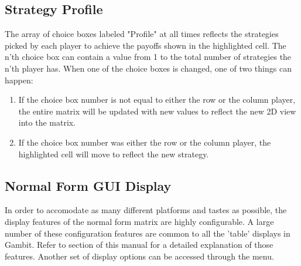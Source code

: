 \subsection{Strategy Profile}
The array of choice boxes labeled "Profile" at all times reflects the
strategies picked by each player to achieve the payoffs shown in the
highlighted cell.  The n'th choice box can contain a value from 1 to the
total number of strategies the n'th player has.  When one of the choice
boxes is changed, one of two things can happen:
\begin{enumerate}
\item If the choice box number is not equal to either the row or
the column player, the entire matrix will be updated with new values to
reflect the new 2D view into the matrix.
\item If the choice box number was either the row or the column player,
the highlighted cell will move to reflect the new strategy.
\end{enumerate}

\subsection{Normal Form GUI Display}
In order to accomodate as many different platforms and tastes as possible,
the display features of the normal form matrix are highly configurable.  A
large number of these configuration features are common to all the 'table'
displays in Gambit.  Refer to  section
of this manual for a detailed explanation of those features.  Another set
of display options can be accessed through the 
 menu.

